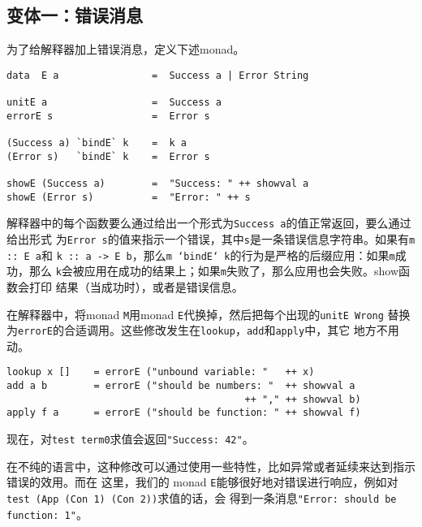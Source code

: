 \documentclass[12pt]{article}
\begin{document}
\subsection{变体一：错误消息}\label{sec:err_msg}
\noindent{}为了给解释器加上错误消息，定义下述monad。
\begin{verbatim}
data  E a                =  Success a | Error String

unitE a                  =  Success a
errorE s                 =  Error s

(Success a) `bindE` k    =  k a
(Error s)   `bindE` k    =  Error s

showE (Success a)        =  "Success: " ++ showval a
showE (Error s)          =  "Error: " ++ s
\end{verbatim}
\noindent{}解释器中的每个函数要么通过给出一个形式为\texttt{Success a}的值正常返回，要么通过给出形式
为\texttt{Error s}的值来指示一个错误，其中\texttt{s}是一条错误信息字符串。如果有\texttt{m :: E a}和
\texttt{k :: a -> E b}，那么\texttt{m `bindE` k}的行为是严格的后缀应用：如果\texttt{m}成功，那么
\texttt{k}会被应用在成功的结果上；如果\texttt{m}失败了，那么应用也会失败。show函数会打印
结果（当成功时），或者是错误信息。

\indent{}在解释器中，将monad \texttt{M}用monad \texttt{E}代换掉，然后把每个出现的\texttt{unitE Wrong}
替换为\texttt{errorE}的合适调用。这些修改发生在\texttt{lookup}，\texttt{add}和\texttt{apply}中，其它
地方不用动。
\begin{verbatim}
lookup x []    = errorE ("unbound variable: "   ++ x)
add a b        = errorE ("should be numbers: "  ++ showval a
                                         ++ "," ++ showval b)
apply f a      = errorE ("should be function: " ++ showval f)
\end{verbatim}
\noindent{}现在，对\texttt{test term0}求值会返回\texttt{"Success: 42"}。

\indent{}在不纯的语言中，这种修改可以通过使用一些特性，比如异常或者延续来达到指示错误的效用。而在
这里，我们的 monad \texttt{E}能够很好地对错误进行响应，例如对\texttt{test (App (Con 1) (Con 2))}求值的话，会
得到一条消息\texttt{"Error: should be function: 1"}。
\end{document}
